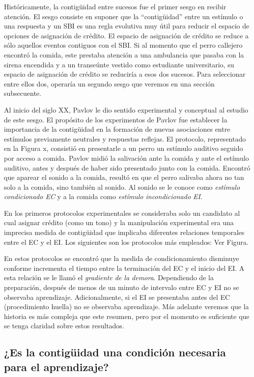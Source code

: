 \documentclass[
  a4paper,
  DIV=11,
  numbers=noendperiod]{scrreprt}
\begin{document}
Históricamente, la contigüidad entre sucesos fue el primer sesgo en
recibir atención. El sesgo consiste en suponer que la ``contigüidad''
entre un estímulo o una respuesta y un SBI es una regla evolutiva muy
útil para reducir el espacio de opciones de asignación de crédito. El
espacio de asignación de crédito se reduce a sólo aquellos eventos
contiguos con el SBI. Si al momento que el perro callejero encontró la
comida, este prestaba atención a una ambulancia que pasaba con la sirena
encendida y a un transeúnte vestido como estudiante universitario, su
espacio de asignación de crédito se reduciría a esos dos sucesos. Para
seleccionar entre ellos dos, operaría un segundo sesgo que veremos en
una sección subsecuente.

Al inicio del siglo XX, Pavlov le dio sentido experimental y conceptual
al estudio de este sesgo. El propósito de los experimentos de Pavlov fue
establecer la importancia de la contigüidad en la formación de nuevas
asociaciones entre estímulos previamente neutrales y respuestas
reflejas. El protocolo, representado en la Figura x, consistió en
presentarle a un perro un estímulo auditivo seguido por acceso a comida.
Pavlov midió la salivación ante la comida y ante el estímulo auditivo,
antes y después de haber sido presentado junto con la comida. Encontró
que aparear el sonido a la comida, resultó en que el perro salivaba
ahora no tan solo a la comida, sino también al sonido. Al sonido se le
conoce como \emph{estímulo condicionado EC } y a la comida como
\emph{estímulo incondicionado EI}.

En los primeros protocolos experimentales se consideraba solo un
candidato al cual asignar crédito (como un tono) y la manipulación
experimental era una imprecisa medida de contigüidad que implicaba
diferentes relaciones temporales entre el EC y el EI. Los siguientes son
los protocolos más empleados: Ver Figura.

En estos protocolos se encontró que la medida de condicionamiento
disminuye conforme incrementa el tiempo entre la terminación del EC y el
inicio del EI. A esta relación se le llamó el \emph{gradiente de la
demora}. Dependiendo de la preparación, después de menos de un minuto de
intervalo entre EC y EI no se observaba aprendizaje. Adicionalmente, si
el EI se presentaba antes del EC (procedimiento huella) no se observaba
aprendizaje. Más adelante veremos que la historia es más compleja que
este resumen, pero por el momento es suficiente que se tenga claridad
sobre estos resultados.

\subsection{¿Es la contigüidad una condición necesaria para el
aprendizaje?}\label{es-la-contiguxfcidad-una-condiciuxf3n-necesaria-para-el-aprendizaje}
\end{document}
